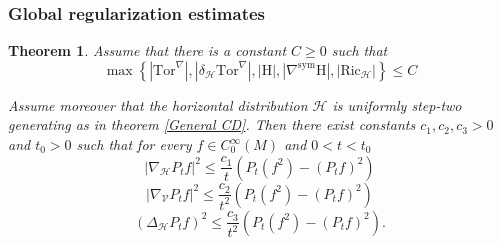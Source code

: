 \documentclass[11pt]{article}
\numberwithin{equation}{section}
\newtheorem{theorem}{Theorem}[section]
\newcommand{\Ho}{\mathcal H}
\newcommand{\V}{\mathcal V}
\newcommand{\Tor}{\mathrm{Tor}}
\begin{document}
\subsubsection{Global regularization estimates}


\begin{theorem}
Assume that there is a constant $C \ge 0 $ such that
\[
\max \left\{ | \Tor^\nabla |, | \delta_\Ho \Tor^\nabla |, | \mathrm H| , |\nabla^{\mathrm{sym}} \mathrm{H} |, | \mathrm{Ric}_\Ho| \right\} \le C
\]

Assume moreover that the horizontal distribution $\Ho$ is uniformly step-two generating as in theorem \ref{General CD}. Then there exist constants $c_1,c_2,c_3>0$ and $t_0>0$ such that for every $f \in C_0^\infty(M)$ and $0<t <t_0$
\[
| \nabla_\Ho P_t f |^2 \le \frac{c_1}{t}  \left( P_t(f^2)-(P_t f)^2 \right)
\]
\[
| \nabla_\V P_t f |^2 \le \frac{c_2}{t^2}  \left( P_t(f^2)-(P_t f)^2 \right)
\]
\[
(\Delta_\Ho P_t f)^2 \le  \frac{c_3}{t^2}  \left( P_t(f^2)-(P_t f)^2 \right).
\]
\end{theorem}
\end{document}
